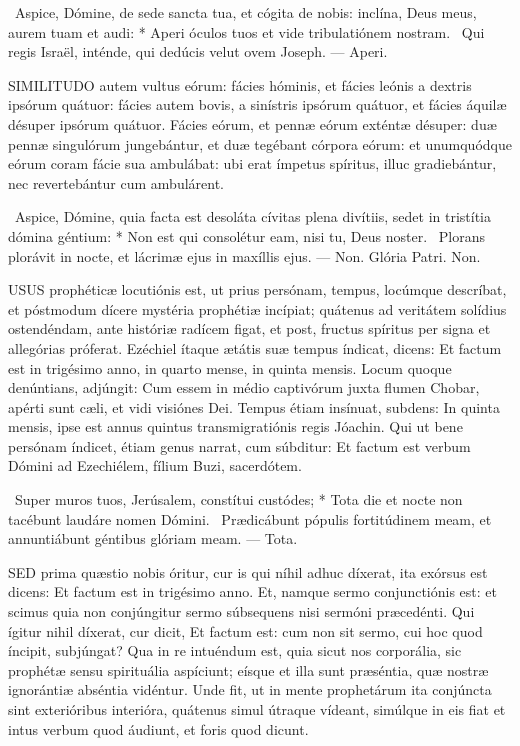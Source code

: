 \R\ Aspice, Dómine, de sede sancta tua, et cógita de nobis: inclína, Deus meus, aurem tuam et audi: * Aperi óculos tuos et vide tribulatiónem nostram. \V\ Qui regis Israël, inténde, qui dedúcis velut ovem Joseph. — Aperi.


\lettrine[lines=2]{S}{IMILITUDO} autem vultus eórum: fácies hóminis, et fácies leónis a dextris ipsórum quátuor: fácies autem bovis, a sinístris ipsórum quátuor, et fácies áquilæ désuper ipsórum quátuor. Fácies eórum, et pennæ eórum exténtæ désuper: duæ pennæ singulórum jungebántur, et duæ tegébant córpora eórum: et unumquódque eórum coram fácie sua ambulábat: ubi erat ímpetus spíritus, illuc gradiebántur, nec revertebántur cum ambulárent.

\R\ Aspice, Dómine, quia facta est desoláta cívitas plena divítiis, sedet in tristítia dómina géntium: * Non est qui consolétur eam, nisi tu, Deus noster. \V\ Plorans plorávit in nocte, et lácrimæ ejus in maxíllis ejus. — Non. Glória Patri. Non.




\lettrine[lines=2]{U}{SUS} prophéticæ locutiónis est, ut prius persónam, tempus, locúmque descríbat, et póstmodum dícere mystéria prophétiæ incípiat; quátenus ad veritátem solídius ostendéndam, ante históriæ radícem figat, et post, fructus spíritus per signa et allegórias próferat. Ezéchiel ítaque ætátis suæ tempus índicat, dicens: Et factum est in trigésimo anno, in quarto mense, in quinta mensis. Locum quoque denúntians, adjúngit: Cum essem in médio captivórum juxta flumen Chobar, apérti sunt cæli, et vidi visiónes Dei. Tempus étiam insínuat, subdens: In quinta mensis, ipse est annus quintus transmigratiónis regis Jóachin. Qui ut bene persónam índicet, étiam genus narrat, cum súbditur: Et factum est verbum Dómini ad Ezechiélem, fílium Buzi, sacerdótem.

\R\ Super muros tuos, Jerúsalem, constítui custódes; * Tota die et nocte non tacébunt laudáre nomen Dómini. \V\ Prædicábunt pópulis fortitúdinem meam, et annuntiábunt géntibus glóriam meam. — Tota.


\lettrine[lines=2]{S}{ED} prima quæstio nobis óritur, cur is qui níhil adhuc díxerat, ita exórsus est dicens: Et factum est in trigésimo anno. Et, namque sermo conjunctiónis est: et scimus quia non conjúngitur sermo súbsequens nisi sermóni præcedénti. Qui ígitur nihil díxerat, cur dicit, Et factum est: cum non sit sermo, cui hoc quod íncipit, subjúngat? Qua in re intuéndum est, quia sicut nos corporália, sic prophétæ sensu spirituália aspíciunt; eísque et illa sunt præséntia, quæ nostræ ignorántiæ abséntia vidéntur. Unde fit, ut in mente prophetárum ita conjúncta sint exterióribus interióra, quátenus simul útraque vídeant, simúlque in eis fiat et intus verbum quod áudiunt, et foris quod dicunt.

